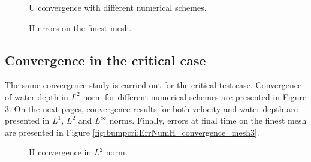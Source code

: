 \begin{figure}[H]
\begin{minipage}[t]{0.50\textwidth}
 \centering
\end{minipage}
\begin{minipage}[t]{0.50\textwidth}
 \centering
\end{minipage}%
\begin{minipage}[t]{0.50\textwidth}
 \centering
\end{minipage}
\begin{minipage}[t]{0.50\textwidth}
 \centering
\end{minipage}%
\begin{minipage}[t]{0.50\textwidth}
 \centering
\end{minipage}
  \caption{U convergence with different numerical schemes.}
 \label{t2d:bumpsub:mesh_convergence_U}
\end{figure}

\begin{figure}[H]
\centering
  \caption{H errors on the finest mesh.}
\label{fig:bump:ErrNumH_convergence_mesh3}
\end{figure}


\subsection{Convergence in the critical case}

The same convergence study is carried out for the critical test case.
Convergence of water depth in $L^2$ norm for different numerical schemes are presented in Figure \ref{fig:bumpcri:ErrNumH_convergence}. On the next pages, convergence results for both velocity and water depth
are presented in $L^1$, $L^2$ and $L^{\infty}$ norms. Finally, errors at final time on the finest mesh are presented in Figure \ref{fig:bumpcri:ErrNumH_convergence_mesh3}.

\begin{figure}[H]
\centering
  \caption{H convergence in $L^2$ norm.}
\label{fig:bumpcri:ErrNumH_convergence}
\end{figure}


